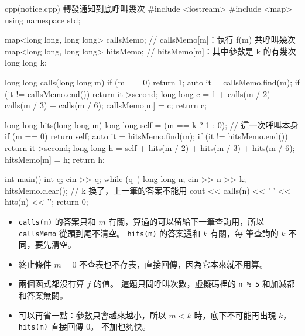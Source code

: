 \begin{example}[label=ex:rec-notice]{cpp}{(notice.cpp) 轉發通知到底呼叫幾次}
#include <iostream>
#include <map>
using namespace std;

map<long long, long long> callsMemo;   // callsMemo[m]：執行 f(m) 共呼叫幾次
map<long long, long long> hitsMemo;    // hitsMemo[m]：其中參數是 k 的有幾次
long long k;

long long calls(long long m) {
    if (m == 0) {
        return 1;
    }
    auto it = callsMemo.find(m);
    if (it != callsMemo.end()) {
        return it->second;
    }
    long long c = 1 + calls(m / 2) + calls(m / 3) + calls(m / 6);
    callsMemo[m] = c;
    return c;
}

long long hits(long long m) {
    long long self = (m == k ? 1 : 0);   // 這一次呼叫本身
    if (m == 0) {
        return self;
    }
    auto it = hitsMemo.find(m);
    if (it != hitsMemo.end()) {
        return it->second;
    }
    long long h = self + hits(m / 2) + hits(m / 3) + hits(m / 6);
    hitsMemo[m] = h;
    return h;
}

int main() {
    int q;
    cin >> q;
    while (q--) {
        long long n;
        cin >> n >> k;
        hitsMemo.clear();                // k 換了，上一筆的答案不能用
        cout << calls(n) << ' ' << hits(n) << '\n';
    }
    return 0;
}
\end{example}


\begin{itemize}
\item \texttt{calls(m)} 的答案只和 $m$ 有關，算過的可以留給下一筆查詢用，所以
\texttt{callsMemo} 從頭到尾不清空。 \texttt{hits(m)} 的答案還和 $k$ 有關，每
筆查詢的 $k$ 不同，要先清空。
\item 終止條件 $m = 0$ 不查表也不存表，直接回傳，因為它本來就不用算。
\item 兩個函式都沒有算 $f$ 的值。 這題只問呼叫次數，虛擬碼裡的 \texttt{n \% 5}
和加減都和答案無關。
\item 可以再省一點：參數只會越來越小，所以 $m < k$ 時，底下不可能再出現 $k$，
\texttt{hits(m)} 直接回傳 $0$。 不加也夠快。
\end{itemize}

